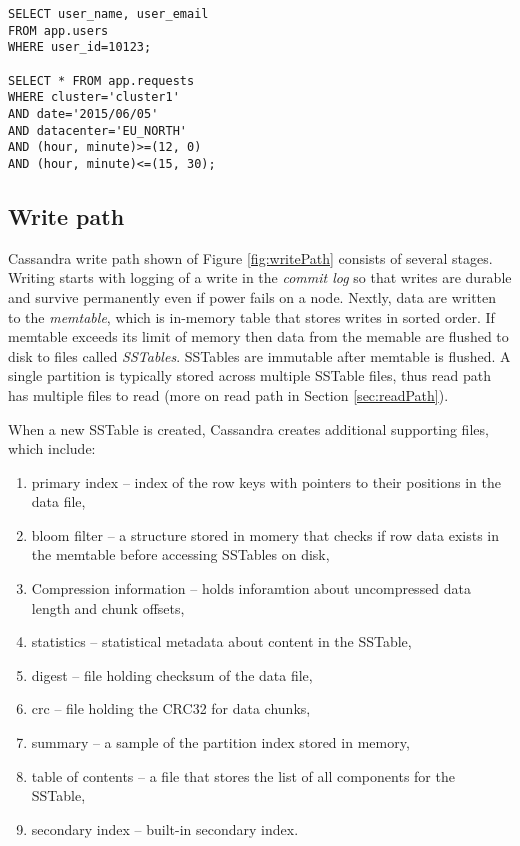 \begin{lstlisting}[style=outcode,label={lst:cqlSelect},caption={Examples of CQL select statements}]
SELECT user_name, user_email 
FROM app.users 
WHERE user_id=10123;
    
SELECT * FROM app.requests
WHERE cluster='cluster1'
AND date='2015/06/05'
AND datacenter='EU_NORTH'
AND (hour, minute)>=(12, 0) 
AND (hour, minute)<=(15, 30);
\end{lstlisting}


\subsection{Write path}
Cassandra write path \cite{CassandraWritePath} shown of Figure \ref{fig:writePath} consists of several stages. Writing starts with logging of a write in the \emph{commit log} so that writes are durable and survive permanently even if power fails on a node. 
Nextly, data are written to the \emph{memtable}, which is in-memory table that stores writes in sorted order.
If memtable exceeds its limit of memory then data from the memable are flushed to disk to files called \emph{SSTables}. SSTables are immutable after memtable is flushed. A single partition is typically stored across multiple SSTable files, thus read path has multiple files to read (more on read path in Section \ref{sec:readPath}).

When a new SSTable is created, Cassandra creates additional supporting files, which include: \begin{enumerate}
\item primary index -- index of the row keys with pointers to their positions in the data file,
\item bloom filter -- a structure stored in momery that checks if row data exists in the memtable before accessing SSTables on disk,
\item Compression information -- holds inforamtion about uncompressed data length and chunk offsets,
\item statistics -- statistical metadata about content in the SSTable,
\item digest -- file holding checksum of the data file,
\item crc -- file holding the CRC32 for data chunks,
\item summary -- a sample of the partition index stored in memory,
\item table of contents -- a file that stores the list of all components for the SSTable,
\item secondary index -- built-in secondary index.
\end{enumerate}

